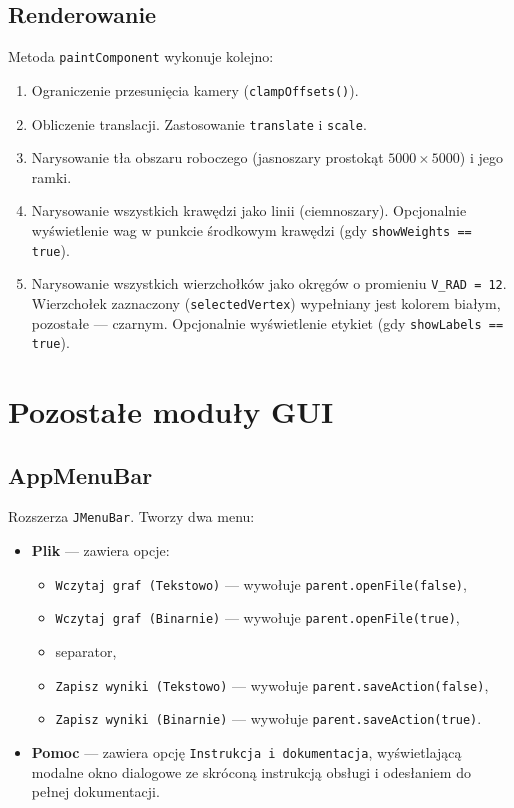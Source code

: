\documentclass[a4paper, 11pt]{article}
\begin{document}
\subsection{Renderowanie}

Metoda \texttt{paintComponent} wykonuje kolejno:
\begin{enumerate}
  \item Ograniczenie przesunięcia kamery (\texttt{clampOffsets()}).
  \item Obliczenie translacji. Zastosowanie \texttt{translate} i \texttt{scale}.
  \item Narysowanie tła obszaru roboczego (jasnoszary prostokąt
    $5000 \times 5000$) i jego ramki.
  \item Narysowanie wszystkich krawędzi jako linii (ciemnoszary).
    Opcjonalnie wyświetlenie wag w punkcie środkowym krawędzi
    (gdy \texttt{showWeights == true}).
  \item Narysowanie wszystkich wierzchołków jako okręgów o promieniu
    \texttt{V\_RAD = 12}. Wierzchołek zaznaczony (\texttt{selectedVertex})
    wypełniany jest kolorem białym, pozostałe --- czarnym.
    Opcjonalnie wyświetlenie etykiet (gdy \texttt{showLabels == true}).
\end{enumerate}

\section{Pozostałe moduły GUI}

\subsection{AppMenuBar}

Rozszerza \texttt{JMenuBar}. Tworzy dwa menu:

\begin{itemize}
  \item \textbf{Plik} --- zawiera opcje:
    \begin{itemize}
      \item \texttt{Wczytaj graf (Tekstowo)} --- wywołuje \texttt{parent.openFile(false)},
      \item \texttt{Wczytaj graf (Binarnie)} --- wywołuje \texttt{parent.openFile(true)},
      \item separator,
      \item \texttt{Zapisz wyniki (Tekstowo)} --- wywołuje
        \texttt{parent.saveAction(false)},
      \item \texttt{Zapisz wyniki (Binarnie)} --- wywołuje
        \texttt{parent.saveAction(true)}.
    \end{itemize}
  \item \textbf{Pomoc} --- zawiera opcję \texttt{Instrukcja i dokumentacja},
    wyświetlającą modalne okno dialogowe ze skróconą instrukcją obsługi
    i odesłaniem do pełnej dokumentacji.
\end{itemize}
\end{document}
